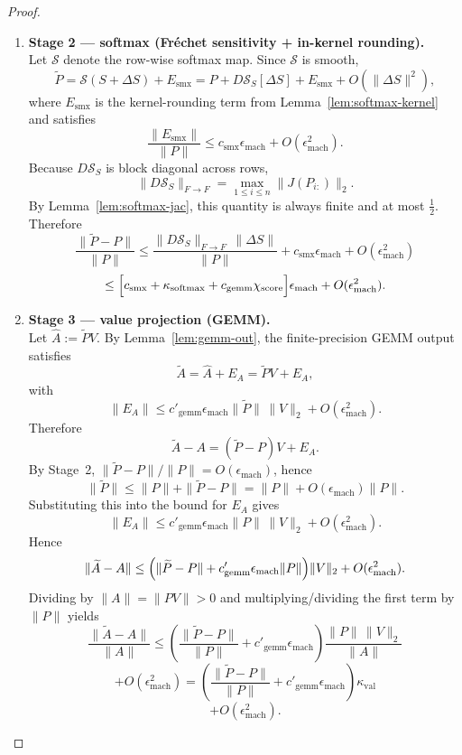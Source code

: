 \documentclass[twoside]{article}
\theoremstyle{definition}
\theoremstyle{remark}
\begin{document}
\begin{proof}
\begin{enumerate}
  \item \textbf{Stage 2 --- softmax (Fr\'echet sensitivity + in-kernel rounding).}\\
  Let $\mathcal{S}$ denote the row-wise softmax map. Since $\mathcal{S}$ is smooth,
  \[
  \widetilde{P}
  = \mathcal{S}(S+\Delta S) + E_{\mathrm{smx}}
  = P + D\mathcal{S}_S[\Delta S] + E_{\mathrm{smx}} + O(\|\Delta S\|^2),
  \]
  where $E_{\mathrm{smx}}$ is the kernel-rounding term from
  Lemma~\ref{lem:softmax-kernel} and satisfies
  \[
  \frac{\|E_{\mathrm{smx}}\|}{\|P\|}
  \le c_{\mathrm{smx}}\epsilon_{\mathrm{mach}} + O(\epsilon_{\mathrm{mach}}^2).
  \]
  Because $D\mathcal{S}_S$ is block diagonal across rows,
  \[
  \|D\mathcal{S}_S\|_{F\to F}
  = \max_{1 \le i \le n}\|J(P_{i:})\|_2.
  \]
  By Lemma~\ref{lem:softmax-jac}, this quantity is always finite and at most
  $\tfrac12$.
  Therefore
  \[
  \frac{\|\widetilde{P}-P\|}{\|P\|}
  \le
  \frac{\|D\mathcal{S}_S\|_{F\to F}\,\|\Delta S\|}{\|P\|}
  + c_{\mathrm{smx}}\epsilon_{\mathrm{mach}}
  + O(\epsilon_{\mathrm{mach}}^2)
  \]
  \[
  \le
  \Bigl[
  c_{\mathrm{smx}}
  +
  \kappa_{\mathrm{softmax}}
  +
  c_{\mathrm{gemm}}\chi_{\mathrm{score}}
  \Bigr]\epsilon_{\mathrm{mach}}
  + O(\epsilon_{\mathrm{mach}}^2).
  \]
  \item \textbf{Stage 3 — value projection (GEMM).}\\
  Let $\widehat{A}:=\widetilde{P}V$. By Lemma~\ref{lem:gemm-out}, the finite-precision
  GEMM output satisfies
  \[
  \widetilde{A}
  =
  \widehat{A}+E_A
  =
  \widetilde{P}V+E_A,
  \]
  with
  \[
  \|E_A\|
  \le
  c'_{\mathrm{gemm}}\epsilon_{\mathrm{mach}}\|\widetilde{P}\|\,\|V\|_2
  + O(\epsilon_{\mathrm{mach}}^2).
  \]
  Therefore
  \[
  \widetilde{A}-A
  =
  (\widetilde{P}-P)V + E_A.
  \]
  By Stage~2, $\|\widetilde{P}-P\|/\|P\|=O(\epsilon_{\mathrm{mach}})$, hence
  \[
  \|\widetilde{P}\|
  \le
  \|P\|+\|\widetilde{P}-P\|
  =
  \|P\|+O(\epsilon_{\mathrm{mach}})\|P\|.
  \]
  Substituting this into the bound for $E_A$ gives
  \[
  \|E_A\|
  \le
  c'_{\mathrm{gemm}}\epsilon_{\mathrm{mach}}\|P\|\,\|V\|_2
  + O(\epsilon_{\mathrm{mach}}^2).
  \]
  Hence
  \[
  \|\widetilde{A}-A\|
  \le
  \Bigl(
  \|\widetilde{P}-P\|
  +
  c'_{\mathrm{gemm}}\epsilon_{\mathrm{mach}}\|P\|
  \Bigr)\|V\|_2
  + O(\epsilon_{\mathrm{mach}}^2).
  \]
  Dividing by $\|A\|=\|PV\|>0$ and multiplying/dividing the first term by
  $\|P\|$ yields
  \[
  \frac{\|\widetilde{A}-A\|}{\|A\|}
  \le
  \left(\frac{\|\widetilde{P}-P\|}{\|P\|}
  + c'_{\mathrm{gemm}}\epsilon_{\mathrm{mach}}\right)
  \frac{\|P\|\,\|V\|_2}{\|A\|}
  \]
  \[
  + O(\epsilon_{\mathrm{mach}}^2)
  =
  \left(\frac{\|\widetilde{P}-P\|}{\|P\|}
  + c'_{\mathrm{gemm}}\epsilon_{\mathrm{mach}}\right)\kappa_{\mathrm{val}}
  \]
  \[
  + O(\epsilon_{\mathrm{mach}}^2).
  \]


\end{enumerate}
\end{proof}
\end{document}
